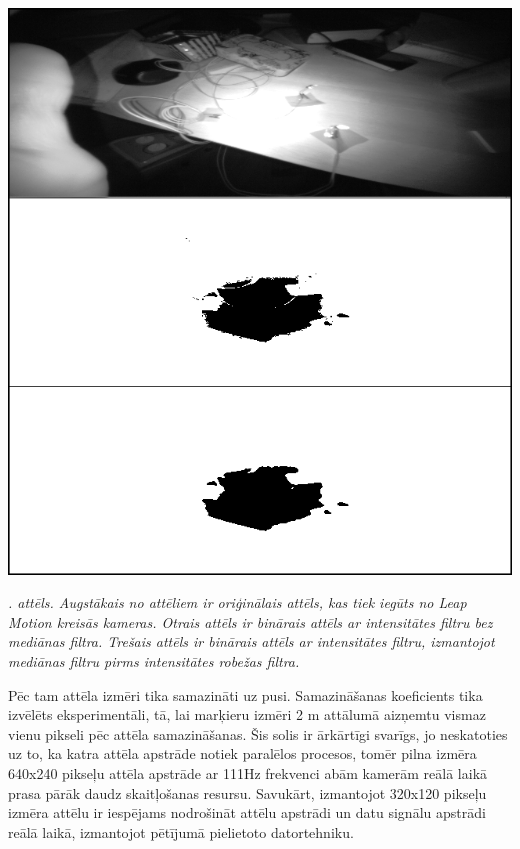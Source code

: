 \documentclass[12pt, a4paper, oneside, openright]{article}
\renewcommand{\thecimages}{\arabic{cimages}}
\begin{document}
\label{cimages:median}
\vspace{10pt}
\begin{samepage}
\begin{center}
\includegraphics[width=1\columnwidth]{images/median.png}
\begin{center}
\footnotesize{
\textit{\thecimages. attēls. Augstākais no attēliem ir oriģinālais attēls, kas tiek iegūts no Leap Motion kreisās kameras. Otrais attēls ir binārais attēls ar intensitātes filtru bez mediānas filtra. Trešais attēls ir binārais attēls ar intensitātes filtru, izmantojot mediānas filtru pirms intensitātes robežas filtra.}}
\end{center}
\end{center}
\end{samepage}

\par Pēc tam attēla izmēri tika samazināti uz pusi. Samazināšanas koeficients tika izvēlēts eksperimentāli,
tā, lai marķieru izmēri 2 m attālumā aizņemtu vismaz vienu pikseli pēc attēla samazināšanas. Šis solis ir ārkārtīgi
svarīgs, jo neskatoties uz to, ka katra attēla apstrāde notiek paralēlos procesos, tomēr pilna izmēra 640x240 pikseļu attēla apstrāde ar 111Hz frekvenci abām kamerām reālā laikā
prasa pārāk daudz skaitļošanas resursu. Savukārt, izmantojot 320x120 pikseļu izmēra attēlu ir iespējams nodrošināt attēlu apstrādi un datu signālu apstrādi reālā laikā,
izmantojot pētījumā pielietoto datortehniku.
\end{document}
